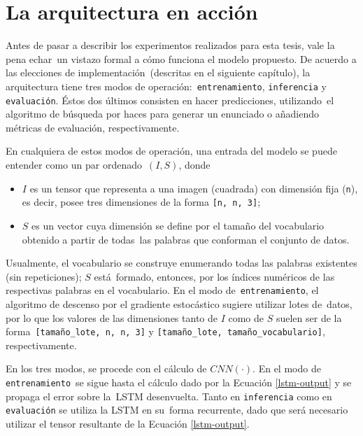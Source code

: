 \section{La arquitectura en acción}\label{sec:arq-accion}

\noindent
Antes de pasar a describir los experimentos realizados para esta tesis, vale la pena echar\
un vistazo formal a cómo funciona el modelo propuesto. De acuerdo a las elecciones de implementación\
(descritas en el siguiente capítulo), la arquitectura tiene tres modos de operación:\
\verb+entrenamiento+, \verb+inferencia+ y \verb+evaluación+. Éstos dos últimos consisten en hacer predicciones, utilizando\
el algoritmo de búsqueda por haces para generar un enunciado o añadiendo métricas de evaluación, respectivamente.\par
En cualquiera de estos modos de operación, una entrada del modelo se puede entender como un par ordenado\
$(I, S)$, donde
\begin{itemize}
\item $I$ es un tensor que representa a una imagen (cuadrada) con dimensión fija (\verb+n+), es decir,
  posee tres dimensiones de la forma \verb+[n, n, 3]+;
\item $S$ es un vector cuya dimensión se define por el tamaño del vocabulario obtenido a partir de todas\
  las palabras que conforman el conjunto de datos.
\end{itemize}\par
Usualmente, el vocabulario se construye enumerando todas las palabras existentes (sin repeticiones); $S$ está\
formado, entonces, por los índices numéricos de las respectivas palabras en el vocabulario. En el modo de\
\verb+entrenamiento+, el algoritmo de descenso por el gradiente estocástico sugiere utilizar lotes de\
datos, por lo que los valores de las dimensiones tanto de $I$ como de $S$ suelen ser de la forma\
\verb+[tamaño_lote, n, n, 3]+ y \verb+[tamaño_lote, tamaño_vocabulario]+, respectivamente.\par
En los tres modos, se procede con el cálculo de $CNN(\cdot)$. En el modo de \verb+entrenamiento+\
se sigue hasta el cálculo dado por la Ecuación \ref{lstm-output} y se propaga el error sobre la\
LSTM desenvuelta. Tanto en \verb+inferencia+ como en \verb+evaluación+ se utiliza la LSTM en su\
forma recurrente, dado que será necesario utilizar el tensor resultante de la Ecuación \ref{lstm-output}.
